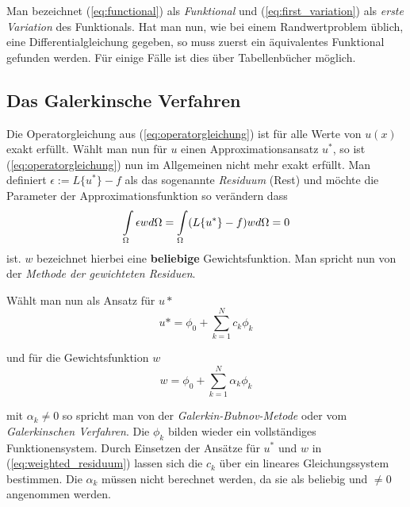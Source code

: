  Man bezeichnet (\ref{eq:functional}) als \textit{Funktional} und (\ref{eq:first_variation}) als \textit{erste Variation} des Funktionals.\newline
 Hat man nun, wie bei einem Randwertproblem üblich, eine Differentialgleichung gegeben, so muss zuerst ein äquivalentes Funktional gefunden werden. Für einige Fälle ist dies über Tabellenbücher möglich.


\subsection{Das Galerkinsche Verfahren}
Die Operatorgleichung aus (\ref{eq:operatorgleichung}) ist für alle Werte von $u(x)$ exakt erfüllt. Wählt man nun für $u$ einen Approximationsansatz $u^*$, so ist (\ref{eq:operatorgleichung}) nun im Allgemeinen nicht mehr exakt erfüllt. Man definiert $\epsilon := L\{ u^* \} -f$ als das sogenannte \textit{Residuum} (Rest) und möchte die Parameter der Approximationsfunktion so verändern dass 
\begin{equation}
\label{eq:weighted_residuum}
\int\displaylimits_{\Omega}\epsilon w d\Omega = \int\displaylimits_{\Omega} (L\{ u^* \} -f)w d\Omega= 0
\end{equation}
ist. $w$ bezeichnet hierbei eine \textbf{beliebige} Gewichtsfunktion. Man spricht nun von der \textit{Methode der gewichteten Residuen}.\newline


Wählt man nun als Ansatz für $u*$
\begin{equation}
u* = \phi_0 + \sum_{k = 1}^{N} c_k \phi_k
\end{equation}

und für die Gewichtsfunktion $w$
\begin{equation}
	w = \phi_0 + \sum_{k = 1}^{N} \alpha_k\phi_k
\end{equation}

mit $\alpha_k \neq 0$ so spricht man von der \textit{Galerkin-Bubnov-Metode} oder vom \textit{Galerkinschen Verfahren}. Die $\phi_k$ bilden wieder ein vollständiges Funktionensystem. Durch Einsetzen der Ansätze für $u^*$ und $w$ in (\ref{eq:weighted_residuum}) lassen sich die $c_k$ über ein lineares Gleichungssystem bestimmen. Die $\alpha_k$ müssen nicht berechnet werden, da sie als beliebig und $\neq 0$ angenommen werden. 

